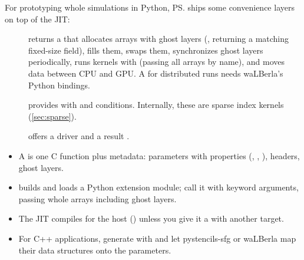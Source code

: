For prototyping whole simulations in Python, \ps{} ships some convenience layers on top
of the JIT:
\begin{description}
  \item[]
        returns a  that allocates arrays with ghost layers
        (, returning a matching fixed-size field), fills them, swaps
        them, synchronizes ghost layers periodically, runs kernels with
         (passing all arrays by name), and moves data
        between CPU and GPU. A  for distributed runs needs
        waLBerla's Python bindings.
  \item[] provides  with
         and  conditions. Internally, these are sparse index
        kernels (\cref{sec:sparse}).
  \item[] offers a  driver and a
        result .
\end{description}

\begin{keyidea}[Summary]
  \begin{itemize}[leftmargin=1.2em]
    \item A  is one C function plus metadata: parameters with properties
          (, , ), headers, ghost
          layers.
    \item {} builds and loads a Python extension module; call it with
          keyword arguments, passing whole arrays including ghost layers.
    \item The JIT compiles for the host () unless you give it a
           with another target.
    \item For C++ applications, generate with  and let pystencils-sfg or
          waLBerla map their data structures onto the parameters.
  \end{itemize}
\end{keyidea}
